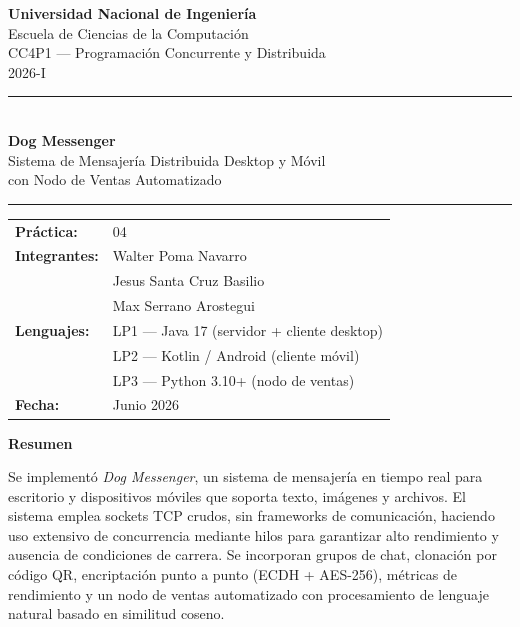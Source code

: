 \documentclass[12pt,a4paper]{article}
\begin{document}
\hypersetup{pageanchor=false}
\begin{titlepage}
\centering
\vspace*{1cm}

{\Large \textbf{Universidad Nacional de Ingeniería}}\\[0.3cm]
{\large Escuela de Ciencias de la Computación}\\[0.2cm]
{\large CC4P1 --- Programación Concurrente y Distribuida}\\[0.2cm]
{\large 2026-I}

\vspace{2cm}
\rule{\linewidth}{1.5pt}\\[0.4cm]
{\LARGE \textbf{Dog Messenger}}\\[0.3cm]
{\large Sistema de Mensajería Distribuida Desktop y Móvil}\\[0.2cm]
{\large con Nodo de Ventas Automatizado}
\rule{\linewidth}{1.5pt}

\vspace{2cm}

\begin{tabular}{ll}
\textbf{Práctica:}    & 04 \\[4pt]
\textbf{Integrantes:} & Walter Poma Navarro \\
                      & Jesus Santa Cruz Basilio\\
                      & Max Serrano Arostegui\\[4pt]
\textbf{Lenguajes:}   & LP1 --- Java 17 (servidor + cliente desktop) \\
                      & LP2 --- Kotlin / Android (cliente móvil) \\
                      & LP3 --- Python 3.10+ (nodo de ventas) \\[4pt]
\textbf{Fecha:}       & Junio 2026 \\
\end{tabular}

\vspace{2cm}
{\large \textbf{Resumen}}\\[0.3cm]
\begin{minipage}{0.85\linewidth}
\small
Se implementó \emph{Dog Messenger}, un sistema de mensajería en tiempo real
para escritorio y dispositivos móviles que soporta texto, imágenes y archivos.
El sistema emplea sockets TCP crudos, sin frameworks de comunicación,
haciendo uso extensivo de concurrencia mediante hilos para garantizar
alto rendimiento y ausencia de condiciones de carrera.
Se incorporan grupos de chat, clonación por código QR,
encriptación punto a punto (ECDH + AES-256), métricas de rendimiento
y un nodo de ventas automatizado con procesamiento de lenguaje natural
basado en similitud coseno.
\end{minipage}

\vfill

\end{titlepage}
\end{document}
